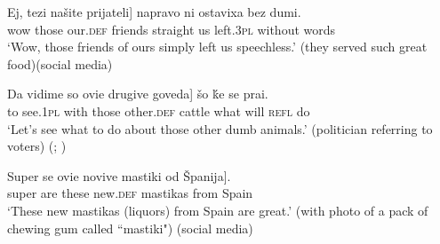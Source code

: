 \documentclass[output=paper,
colorlinks,
citecolor=brown,
newtxmath
]{langscibook}
\begin{document}
\ex \label{speechless}
\gll Ej, 	\minsp{[} tezi 	našite	prijateli] 	napravo 	ni 	ostavixa 	bez 	dumi.\\
wow 	{} those 	our.\textsc{def} friends straight 	us 	left.\textsc{3pl} 	without 	words\\
\glt `Wow, those friends of ours simply left us speechless.' (they served such great food)\hfill (social media)
\z
\z





\ea \label{Mmedia}
\ea \label{cattle}
\gll Da 	vidime 	so 	\minsp{[} ovie 	drugive 	goveda] 	šo 	ḱe	se 	prai.\\
    to 	see.\textsc{1pl} 	with 	 {} those 	other.\textsc{def}	cattle 	what 	will 	\textsc{refl} 	do\\
    \glt ‘Let’s see what to do about those other dumb animals.’ (politician referring to voters) \hfill (; \citealt{Prizma2015})

    \ex \label{mastika}
    \gll Super 	se 	\minsp{[} ovie 	novive 	mastiki 	od 	Španija].\\
    super 	are 	 {} these 	new.\textsc{def} 	mastikas 	from 	Spain\\
    \glt ‘These new mastikas (liquors) from Spain are great.’ (with photo of a pack of chewing gum called ``mastiki") \hfill (social media)
    \z
    \z
\end{document}
